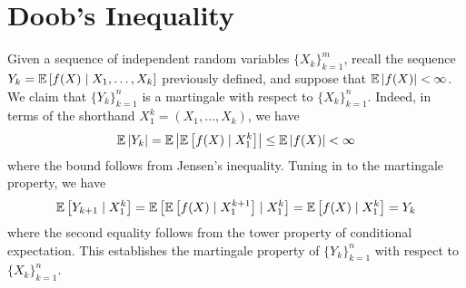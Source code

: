 \begin{theorem}

\end{theorem}

\begin{theorem}

\end{theorem}

\begin{definition}

\end{definition}

\begin{definition}

\end{definition}

\begin{theorem}

\end{theorem}

\section{Doob's Inequality}

\begin{example}
	Given a sequence of independent random variables $\{X_k\}_{k=1}^{m}$, recall the sequence \(Y_{k}={\mathbb E}\left[f(X)\mid X_{1},\ldots,X_{k}\right]\) previously defined, and suppose that \({\mathbb E}\left|f(X)\right|<\infty\). We claim that \(\{Y_{k}\}_{k=1}^{n}\) is a martingale with respect to \(\{X_{k}\}_{k=1}^{n}\). Indeed, in terms of the shorthand \(X_{1}^{k}=(X_{1},\ldots,X_{k})\), we have
	\begin{equation*}
		{\mathbb E}\left|Y_{k}\right|={\mathbb E}\left|{\mathbb E}\left[f(X)\mid X_{1}^{k}\right]\right|\leq{\mathbb E}\left|f(X)\right|<\infty
	\end{equation*}
	where the bound follows from Jensen's inequality. Tuning in to the martingale property, we have
	\begin{equation*}
		{\mathbb E}\left[Y_{k+1}\mid X_{1}^{k}\right]={\mathbb E}\left[{\mathbb E}\left[f(X)\mid X_{1}^{k+1}\right]\mid X_{1}^{k}\right]={\mathbb E}\left[f(X)\mid X_{1}^{k}\right]=Y_{k}
	\end{equation*}
	where the second equality follows from the tower property of conditional expectation. This establishes the martingale property of \(\{Y_{k}\}_{k=1}^{n}\) with respect to \(\{X_{k}\}_{k=1}^{n}\).
\end{example}

